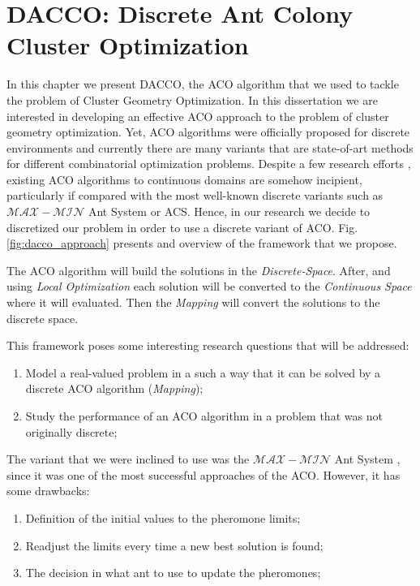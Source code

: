 \chapter{DACCO: Discrete Ant Colony Cluster Optimization}
\label{chap:dacco}

In this chapter we present DACCO, the ACO algorithm that we used to tackle the problem of Cluster Geometry Optimization. In this dissertation we are interested in developing an effective ACO approach to the problem of cluster geometry optimization. Yet, ACO algorithms were officially proposed for discrete environments and currently there are many variants that are state-of-art methods for different combinatorial optimization problems. Despite a few research efforts \cite{bilchev95, kong06, socha04, tsutsui04}, existing ACO algorithms to continuous domains are somehow incipient, particularly if compared with the most well-known discrete variants such as $\mathcal{MAX}-\mathcal{MIN}$ Ant System or ACS. Hence, in our research we decide to discretized our problem in order to use a discrete variant of ACO. Fig. \ref{fig:dacco_approach} presents and overview of the framework that we propose.  


The ACO algorithm will build the solutions in the \emph{Discrete-Space}. After, and using \emph{Local Optimization} each solution will be converted to the \emph{Continuous Space} where it will evaluated. Then the \emph{Mapping} will convert the solutions to the discrete space.

This framework poses some interesting research questions that will be addressed:
\begin{enumerate}
	\item Model a real-valued problem in a such a way that it can be solved by a discrete ACO algorithm (\emph{Mapping});
	\item Study the performance of an ACO algorithm in a problem that was not originally discrete;
\end{enumerate}

The variant that we were inclined to use was the $\mathcal{MAX}-\mathcal{MIN}$ Ant System \cite{stutzle00}, since it was one of the most successful approaches of the ACO.  However, it has some drawbacks:
\begin{enumerate}
	\item Definition of the initial values to the pheromone limits;
	\item Readjust the limits every time a new best solution is found; 
	\item The decision in what ant to use to update the pheromones;
\end{enumerate}

